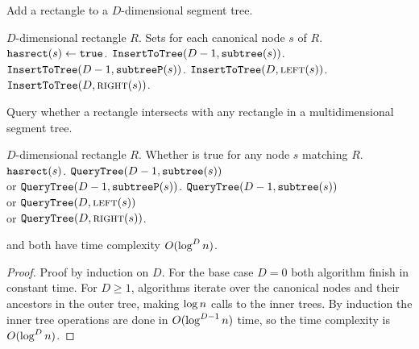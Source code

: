 \documentclass[english,gradu]{tktltiki2018}
\begin{document}
\begin{algorithm}
\caption{Add a rectangle to a $D$-dimensional segment tree.}\label{alg:rectadd}
\begin{algorithmic}
\Require $D$-dimensional rectangle $R$.
\Ensure Sets  for each canonical node $s$ of $R$.
		\State $\texttt{hasrect}(s)\gets\texttt{true}$.
		\State $\texttt{InsertToTree}(D-1,\texttt{subtree}(s))$.
		\State $\texttt{InsertToTree}(D-1,\texttt{subtreeP}(s))$.
		\State $\texttt{InsertToTree}(D,\textsc{left}(s))$.
		\State $\texttt{InsertToTree}(D,\textsc{right}(s))$.
	\EndIf
\EndProcedure
\end{algorithmic}
\end{algorithm}

\begin{algorithm}
\caption{Query whether a rectangle intersects with any rectangle in a multidimensional segment tree.}\label{alg:rectcheck}
\begin{algorithmic}
\Require $D$-dimensional rectangle $R$.
\Output Whether  is true for any node $s$ matching $R$.
		\State \Return $\texttt{hasrect}(s)$.
		\State \Return $\texttt{QueryTree}(D-1,\texttt{subtree}(s))$ \\
		\hspace{20mm} or $\texttt{QueryTree}(D-1,\texttt{subtreeP}(s))$.
		\State \Return $\texttt{QueryTree}(D-1,\texttt{subtree}(s))$ \\
		\hspace{20mm} or $\texttt{QueryTree}(D,\textsc{left}(s))$ \\
		\hspace{20mm} or $\texttt{QueryTree}(D,\textsc{right}(s))$.
	\EndIf
\EndProcedure
\end{algorithmic}
\end{algorithm}

\begin{lem}\adddt and \checkdt both have time complexity $O(\log^Dn)$.\end{lem}
\begin{proof}
Proof by induction on $D$.
For the base case $D=0$ both algorithm finish in constant time.
For $D\ge 1$, algorithms iterate over the canonical nodes and their ancestors in the outer tree, making $\log n$ calls to the inner trees.
By induction the inner tree operations are done in $O(\log^{D-1}n)$ time, so the time complexity is $O(\log^Dn)$.
\end{proof}
\end{document}
